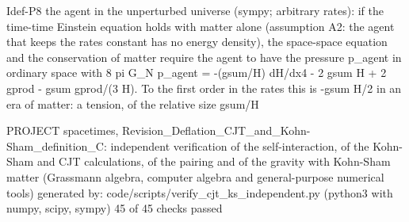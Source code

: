 \documentclass[
  10pt,
]{article}
\newenvironment{Shaded}{}{}
\newcommand{\NormalTok}[1]{#1}
\begin{document}
\begin{Shaded}
\begin{Highlighting}[]
\NormalTok{[PASS] Idef{-}P8  the agent in the unperturbed universe (sympy; arbitrary rates): if the time{-}time Einstein equation holds with matter alone (assumption A2: the agent that keeps the rates constant has no energy density), the space{-}space equation and the conservation of matter require the agent to have the pressure p\_agent in ordinary space with 8 pi G\_N p\_agent = {-}(gsum/H) dH/dx4 {-} 2 gsum H + 2 gprod {-} gsum gprod/(3 H). To the first order in the rates this is {-}gsum H/2 in an era of matter: a tension, of the relative size gsum/H}
\end{Highlighting}
\end{Shaded}

\begin{Shaded}
\begin{Highlighting}[]
\NormalTok{PROJECT spacetimes, Revision\_Deflation\_CJT\_and\_Kohn{-}Sham\_definition\_C: independent verification of the self{-}interaction, of the Kohn{-}Sham and CJT calculations, of the pairing and of the gravity with Kohn{-}Sham matter (Grassmann algebra, computer algebra and general{-}purpose numerical tools)}
\NormalTok{generated by: code/scripts/verify\_cjt\_ks\_independent.py (python3 with numpy, scipy, sympy)}
\NormalTok{45 of 45 checks passed}


\end{Highlighting}
\end{Shaded}
\end{document}
